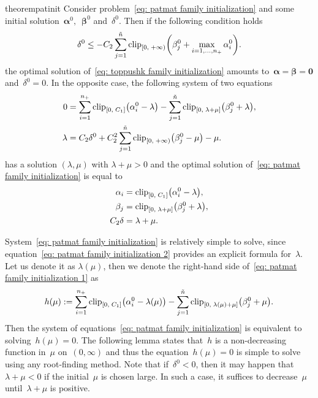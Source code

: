 \begin{restatable}{theorem}{patinit}\label{thm: patmat family initialization}
  Consider problem~\eqref{eq: patmat family initialization} and some initial solution~$\bm{\alpha}^0,$~$\bm{\beta}^0$ and~$\delta^0.$ Then if the following condition holds
  \begin{equation}\label{eq: patmat family initialization condition}
    \delta^0 \le - C_2 \sum_{j = 1}^{\ntil} \clip[u]{0}{+\infty}{\beta_j^0 + \max_{i=1,\dots,\npos} \alpha_i^0}.
  \end{equation}
  the optimal solution of~\eqref{eq: toppushk family initialization} amounts to~$\bm{\alpha} = \bm{\beta} = \bm{0}$ and~$\delta^0 = 0.$ In the opposite case, the following system of two equations
  \begin{subequations}\label{eq: patmat family initialization}
    \begin{align}
    0
      & = \sum_{i=1}^{\npos} \clip{0}{C_1}{\alpha_i^0 - \lambda} - \sum_{j=1}^{\ntil} \clip{0}{\lambda + \mu}{\beta_j^0 + \lambda},
    \label{eq: patmat family initialization 1} \\
    \lambda
      & = C_2 \delta^0 + C_2^2 \sum_{j=1}^{\ntil} \clip[u]{0}{+\infty}{\beta_j^0 - \mu} - \mu.
    \label{eq: patmat family initialization 2}
    \end{align}
  \end{subequations}
  has a solution $(\lambda,\mu)$ with $\lambda+\mu>0$ and the optimal solution of~\eqref{eq: patmat family initialization} is equal to
  \begin{align*}
    \alpha_i & = \clip{0}{C_1}{\alpha_i^0 - \lambda}, \\
    \beta_j & = \clip{0}{\lambda + \mu}{\beta_j^0 + \lambda}, \\
    C_2 \delta &= \lambda + \mu.
  \end{align*}
\end{restatable}

System~\eqref{eq: patmat family initialization} is relatively simple to solve, since equation~\eqref{eq: patmat family initialization 2} provides an explicit formula for~$\lambda$. Let us denote it as $\lambda(\mu)$, then we denote the right-hand side of~\eqref{eq: patmat family initialization 1} as
\begin{equation}\label{eq: patmat family initialization h}
  h(\mu) :=
    \sum_{i=1}^{\npos} \clip{0}{C_1}{\alpha_i^0 - \lambda(\mu)} - \sum_{j=1}^{\ntil} \clip{0}{\lambda(\mu) + \mu}{\beta_j^0 + \mu}.
\end{equation}
Then the system of equations~\eqref{eq: patmat family initialization} is equivalent to solving~$h(\mu) = 0$. The following lemma states that~$h$ is a non-decreasing function in~$\mu$ on~$(0,\infty)$ and thus the equation~$h(\mu) = 0$ is simple to solve using any root-finding method. Note that if~$\delta^0 < 0$, then it may happen that~$\lambda + \mu < 0$ if the initial~$\mu$ is chosen large. In such a case, it suffices to decrease~$\mu$ until~$\lambda + \mu$ is positive.

